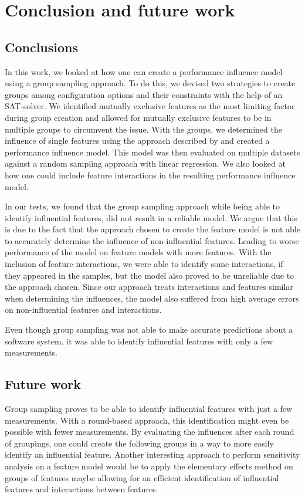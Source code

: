 \documentclass[../thesis.tex]{subfiles}
\begin{document}
\chapter{Conclusion and future work}
\section{Conclusions}
In this work, we looked at how one can create a performance influence model using
a group sampling approach. To do this, we devised two strategies to create groups
among configuration options and their constraints with the help of an SAT-solver. 
We identified mutually exclusive features as the most limiting factor during group
creation and allowed for mutually exclusive features to be in multiple groups to
circumvent the issue. With the groups, we determined the influence of single
features using the approach described by  and
created a performance influence model. This model was then evaluated on
multiple datasets against a random sampling approach with linear regression.
We also looked at how one could include feature interactions in the resulting 
performance influence model.

In our tests, we found that the group sampling approach while being able to identify
influential features, did not result in a reliable model. We argue that this is due
to the fact that the approach chosen to create the feature model is not able to accurately 
determine the influence of non-influential features. 
Leading to worse performance of the model on feature models with more features.
With the inclusion of feature interactions, we were able to identify some interactions,
if they appeared in the samples, but the model also proved to be unreliable due to the approach chosen.
Since our approach treats interactions and features similar when determining the influences,
the model also suffered from high average errors on non-influential features and interactions.

Even though group sampling was not able to make accurate predictions about a software system,
it was able to identify influential features with only a few measurements. 


\section{Future work}

Group sampling proves to be able to identify influential features with just a few measurements.
With a round-based approach, this identification might even be possible with fewer measurements.
By evaluating the influences after each round of groupings, one could create the following
groups in a way to more easily identify an influential feature. 
Another interesting approach to perform sensitivity analysis on a feature model would be 
to apply the elementary effects method on groups of features maybe allowing for an efficient
identification of influential features and interactions between features.
\end{document}
